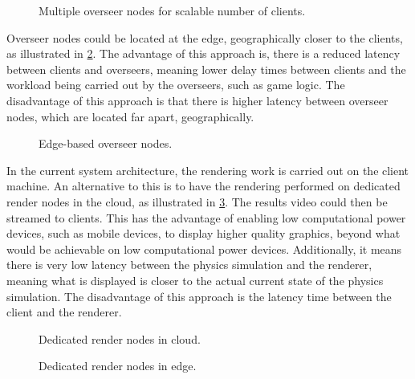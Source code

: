\begin{figure}
	\centering
	\scalebox{1.25}{}
	\caption{Multiple overseer nodes for scalable number of clients.}
	\label{MultiOverseer}
\end{figure}

Overseer nodes could be located at the edge, geographically closer to the clients, as illustrated in \ref{EdgeOverseer}. The advantage of this approach is, there is a reduced latency between clients and overseers, meaning lower delay times between clients and the workload being carried out by the overseers, such as game logic. The disadvantage of this approach is that there is higher latency between overseer nodes, which are located far apart, geographically.

\begin{figure}
	\centering
	\scalebox{1.25}{}
	\caption{Edge-based overseer nodes.}
	\label{EdgeOverseer}
\end{figure}

In the current system architecture, the rendering work is carried out on the client machine. An alternative to this is to have the rendering performed on dedicated render nodes in the cloud, as illustrated in \ref{RenderNodes}. The results video could then be streamed to clients. This has the advantage of enabling low computational power devices, such as mobile devices, to display higher quality graphics, beyond what would be achievable on low computational power devices. Additionally, it means there is very low latency between the physics simulation and the renderer, meaning what is displayed is closer to the actual current state of the physics simulation. The disadvantage of this approach is the latency time between the client and the renderer.


\begin{figure}
	\centering
	\scalebox{1.25}{}
	\caption{Dedicated render nodes in cloud.}
	\label{RenderNodes}
\end{figure}

\begin{figure}
	\centering
	\scalebox{1.25}{}
	\caption{Dedicated render nodes in edge.}
\end{figure}

